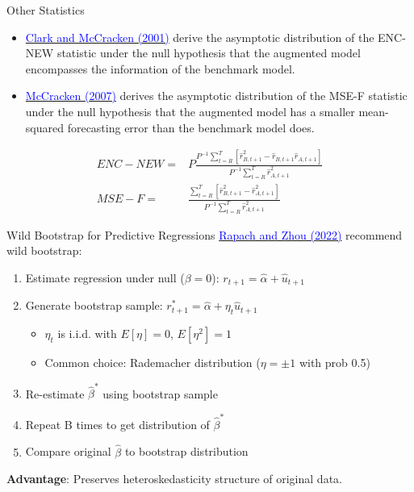 \documentclass{beamer}
\begin{document}
\begin{frame}{Other Statistics}
\begin{itemize}
		\item \href{https://doi.org/10.1016/S0304-4076(01)00071-9}{\textcolor{blue}{Clark and McCracken (2001)}}  derive the asymptotic distribution of the ENC-NEW statistic under the null hypothesis that the augmented model encompasses the information of the benchmark model.
		\item \href{https://doi.org/10.1016/j.jeconom.2006.07.020}{\textcolor{blue}{McCracken (2007)}} derives the asymptotic distribution of the MSE-F statistic under the null hypothesis that the augmented model has a smaller mean-squared forecasting error than the benchmark model does.
	\end{itemize}
	\begin{align*}
		E N C-N E W=&P \frac{P^{-1} \sum_{t=R}^{T}\left[\hat{r}_{B, t+1}^{2}-\hat{r}_{B, t+1} \hat{r}_{A, t+1}\right]}{P^{-1} \sum_{t=R}^{T} \hat{r}_{A, t+1}^{2}}\\
		M S E-F=&\frac{\sum_{t=R}^{T}\left[\hat{r}_{B, t+1}^{2}-\hat{r}_{A, t+1}^{2}\right]}{P^{-1} \sum_{t=R}^{T} \hat{r}_{A, t+1}^{2}}
	\end{align*}
\end{frame}

\begin{frame}{Wild Bootstrap for Predictive Regressions}
	\href{https://doi.org/10.1016/j.jfineco.2019.02.001}{\textcolor{blue}{Rapach and Zhou (2022)}} recommend wild bootstrap:
	
	\begin{enumerate}
		\item Estimate regression under null ($\beta = 0$): $r_{t+1} = \hat{\alpha} + \hat{u}_{t+1}$
		\item Generate bootstrap sample: $r^*_{t+1} = \hat{\alpha} + \eta_t \hat{u}_{t+1}$
		\begin{itemize}
			\item $\eta_t$ is i.i.d. with $E[\eta] = 0$, $E[\eta^2] = 1$
			\item Common choice: Rademacher distribution ($\eta = \pm 1$ with prob 0.5)
		\end{itemize}
		\item Re-estimate $\hat{\beta}^*$ using bootstrap sample
		\item Repeat B times to get distribution of $\hat{\beta}^*$
		\item Compare original $\hat{\beta}$ to bootstrap distribution
	\end{enumerate}
	
	\vspace{5pt}
	\textbf{Advantage}: Preserves heteroskedasticity structure of original data.
\end{frame}
\end{document}
